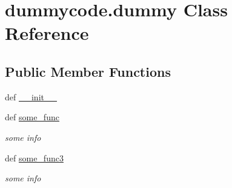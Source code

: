 \section{dummycode.\-dummy Class Reference}
\label{classdummycode_1_1dummy}
\subsection*{Public Member Functions}
\begin{DoxyCompactItemize}
\item 
def \hyperlink{classdummycode_1_1dummy_a674a0e2c1a4f640d13fb13be91869cec}{\-\_\-\-\_\-init\-\_\-\-\_\-}
\item 
def \hyperlink{classdummycode_1_1dummy_a7646a5afb54e46a4ea577bafcb73a4e7}{some\-\_\-func}
\begin{DoxyCompactList}\small\item\em some info \end{DoxyCompactList}\item 
def \hyperlink{classdummycode_1_1dummy_a0ba4f337dcebcb471c9e7947aace7e4e}{some\-\_\-func3}
\begin{DoxyCompactList}\small\item\em some info \end{DoxyCompactList}\end{DoxyCompactItemize}
